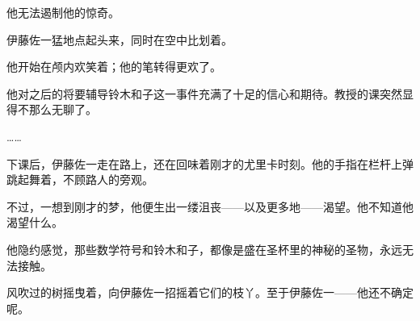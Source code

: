 他无法遏制他的惊奇。

伊藤佐一猛地点起头来，同时在空中比划着。

他开始在颅内欢笑着；他的笔转得更欢了。

他对之后的将要辅导铃木和子这一事件充满了十足的信心和期待。教授的课突然显得不那么无聊了。

……

下课后，伊藤佐一走在路上，还在回味着刚才的尤里卡时刻。他的手指在栏杆上弹跳起舞着，不顾路人的旁观。

不过，一想到刚才的梦，他便生出一缕沮丧——以及更多地——渴望。他不知道他渴望什么。

他隐约感觉，那些数学符号和铃木和子，都像是盛在圣杯里的神秘的圣物，永远无法接触。

风吹过的树摇曳着，向伊藤佐一招摇着它们的枝丫。至于伊藤佐一——他还不确定呢。


